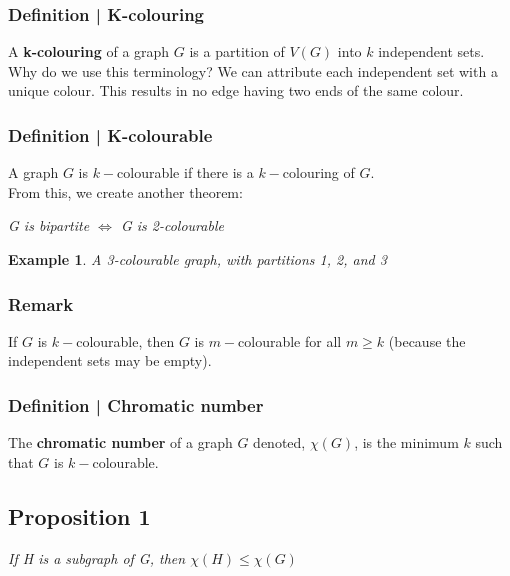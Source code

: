 \documentclass{report}
\newtheorem{ex}{Example}[section]
\begin{document}
\subsubsection{Definition | K-colouring}
A \textbf{k-colouring} of a graph $G$ is a partition of $V(G)$ into $k$ independent sets.\\
Why do we use this terminology? We can attribute each independent set with a unique colour. This results in no edge having two ends of the same colour.
\subsubsection{Definition | K-colourable}
A graph $G$ is $k-$colourable if there is a $k-$colouring of $G$.\\
From this, we create another theorem:
\begin{center}
\textit{G is bipartite $\iff$ G is 2-colourable}
\end{center}
\begin{ex}
A 3-colourable graph, with partitions 1, 2, and 3
\end{ex}
\begin{center}
\end{center}
\subsubsection{Remark}
If $G$ is $k-$colourable, then $G$ is $m-$colourable for all $m \geq k$ (because the independent sets may be empty).
\subsubsection{Definition | Chromatic number}
The \textbf{chromatic number} of a graph $G$ denoted, $\chi(G)$, is the minimum $k$ such that $G$ is $k-$colourable.
\subsection{Proposition 1}
\begin{center}
\textit{If H is a subgraph of G, then $\chi(H)\leq \chi(G)$}
\end{center}
\end{document}
